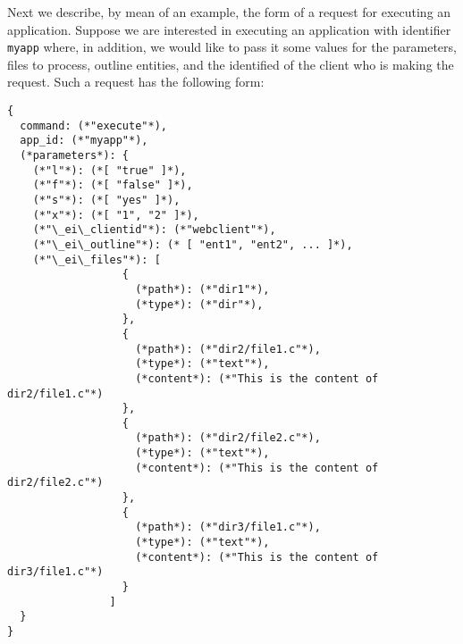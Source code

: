 Next we describe, by mean of an example, the form of a request for
executing an application. Suppose we are interested in executing an
application with identifier \texttt{myapp} where, in addition, we
would like to pass it some values for the parameters, files to
process, outline entities, and the identified of the client who is
making the request. Such a request has the following form:

\bigskip
\begin{lstlisting}
{
  command: (*"execute"*),
  app_id: (*"myapp"*),
  (*parameters*): {
    (*"l"*): (*[ "true" ]*),
    (*"f"*): (*[ "false" ]*),
    (*"s"*): (*[ "yes" ]*),
    (*"x"*): (*[ "1", "2" ]*), 
    (*"\_ei\_clientid"*): (*"webclient"*),
    (*"\_ei\_outline"*): (* [ "ent1", "ent2", ... ]*),
    (*"\_ei\_files"*): [
                  {
                    (*path*): (*"dir1"*),
                    (*type*): (*"dir"*),
                  },
                  {
                    (*path*): (*"dir2/file1.c"*),
                    (*type*): (*"text"*),
                    (*content*): (*"This is the content of dir2/file1.c"*)
                  },
                  {
                    (*path*): (*"dir2/file2.c"*),
                    (*type*): (*"text"*),
                    (*content*): (*"This is the content of dir2/file2.c"*)
                  },
                  {
                    (*path*): (*"dir3/file1.c"*),
                    (*type*): (*"text"*),
                    (*content*): (*"This is the content of dir3/file1.c"*)
                  }
                ]
  }
}
\end{lstlisting}

